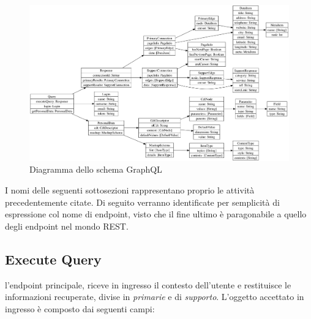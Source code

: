 \begin{figure}[ht]
	\centering
	\includegraphics[width=\textwidth]{5-implementazione-backend/Immagini/graphql-schema.png}
	\caption{Diagramma dello schema GraphQL}\label{fig:schema-graphql}
\end{figure}

I nomi delle seguenti sottosezioni rappresentano proprio le attività precedentemente citate. Di seguito verranno identificate per semplicità di espressione col nome di endpoint, visto che il fine ultimo è paragonabile a quello degli endpoint nel mondo REST.

\subsection{Execute Query\label{sec:execute-query-endpoint}}

\upe l'endpoint principale, riceve in ingresso il contesto dell'utente e restituisce le informazioni recuperate, divise in \emph{primarie} e di \emph{supporto}. L'oggetto accettato in ingresso è composto dai seguenti campi:

